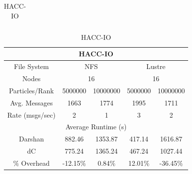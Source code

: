 \begin{table}[h]
\begin{subtable}[h]{0.5\textwidth}
\begin{tabular}{|ccccc|}
        \end{tabular}
    \caption{MPI-IO} 
    \label{subtable:mpi-io-test}
    \vspace{0.5cm}
    \end{subtable}
    \begin{subtable}[h]{0.5\textwidth}
        \centering
        \setlength\tabcolsep{5.5pt}
        \begin{tabular}{|ccccc|}
        \hline
        \multicolumn{5}{|c|}{HACC-IO}                                                                                                                   \\ \hline
        \multicolumn{1}{|c|}{File System}     & \multicolumn{2}{c|}{NFS}                                      & \multicolumn{2}{c|}{Lustre}             \\ \hline
        \multicolumn{1}{|c|}{Nodes}           & \multicolumn{2}{c|}{16}                                       & \multicolumn{2}{c|}{16}                 \\ \hline
        \multicolumn{1}{|c|}{Particles/Rank}  & \multicolumn{1}{c|}{5000000}  & \multicolumn{1}{c|}{10000000} & \multicolumn{1}{c|}{5000000} & 10000000 \\ \hline
        \multicolumn{1}{|c|}{Avg. Messages}   & \multicolumn{1}{c|}{1663}     & \multicolumn{1}{c|}{1774}     & \multicolumn{1}{c|}{1995}    & 1711     \\ \hline
        \multicolumn{1}{|c|}{Rate (msgs/sec)} & \multicolumn{1}{c|}{2}        & \multicolumn{1}{c|}{1}        & \multicolumn{1}{c|}{3}       & 2        \\ \hline
        \multicolumn{5}{|c|}{Average Runtime (s)}                                                                                                       \\ \hline
        \multicolumn{1}{|c|}{Darshan}         & \multicolumn{1}{c|}{882.46}   & \multicolumn{1}{c|}{1353.87}  & \multicolumn{1}{c|}{417.14}  & 1616.87  \\ \hline
        \multicolumn{1}{|c|}{dC}              & \multicolumn{1}{c|}{775.24}   & \multicolumn{1}{c|}{1365.24}  & \multicolumn{1}{c|}{467.24}  & 1027.44  \\ \hline
        \multicolumn{1}{|c|}{\% Overhead}     & \multicolumn{1}{c|}{-12.15\%} & \multicolumn{1}{c|}{0.84\%}   & \multicolumn{1}{c|}{12.01\%} & -36.45\% \\ \hline
        \end{tabular}
    \caption{HACC-IO} 
    \label{subtable:HACC}
    \vspace{0.5cm}

\end{subtable}
\end{table}
